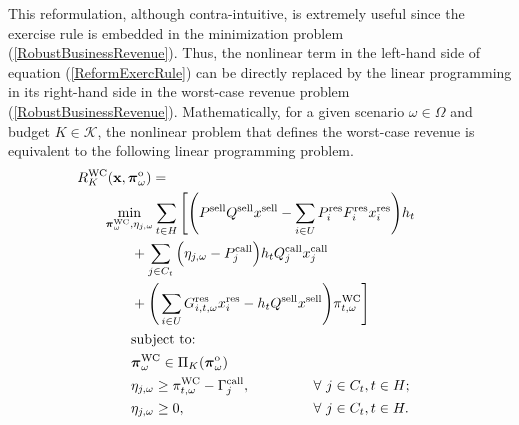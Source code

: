 	This reformulation, although contra-intuitive, is extremely useful since the exercise rule is embedded in the minimization problem (\ref{RobustBusinessRevenue}). Thus, the nonlinear term in the left-hand side of equation (\ref{ReformExercRule}) can be directly replaced by the linear programming in its right-hand side in the worst-case revenue problem (\ref{RobustBusinessRevenue}). Mathematically, for a given scenario $\omega \in \Omega$ and budget $K \in \mathcal{K}$, the nonlinear problem that defines the worst-case revenue is equivalent to the following linear programming problem.
%
\begin{align}
	& \hspace{-0.45cm} R_{K}^{\text{WC}}(\mathbf{x}, \boldsymbol{\pi}_{\omega}^{\text{o}}) = \notag \\ 
	& \hspace{0.2cm} \min_{\boldsymbol{\pi}^{\text{WC}}_{\omega}, \eta_{j,\omega}} \sum_{t \in H} \Bigg[ \Bigg(P^{\text{sell}} Q^{\text{sell}} x^{\text{sell}} - \sum_{i \in U} P_{i}^{\text{res}} F_{i}^{\text{res}} x_{i}^{\text{res}}\Bigg) h_{t} \notag \\
	& \hspace{0.90cm} + \sum_{j \in C_{t}} \Big( \eta_{j,\omega} - P_{j}^{\text{call}} \Big) h_{t} Q_{j}^{\text{call}} x_{j}^{\text{call}} \notag \\
	& \hspace{0.90cm} + \Bigg( \sum_{i \in U} G_{i,t,\omega}^{\text{res}} x_{i}^{\text{res}} - h_{t} Q^{\text{sell}} x^{\text{sell}} \Bigg)\pi^{\text{WC}}_{t,\omega} \Bigg] \label{RobustBusinessRevenue_Linear1} \\
	& \hspace{0.90cm} \text{subject to:} \notag \\
	& \hspace{0.90cm} \boldsymbol{\pi}^{\text{WC}}_{\omega} \in \Pi_{K}(\boldsymbol{\pi}^{\text{o}}_{\omega}) \label{RobustBusinessRevenue_Linear2} \\
	& \hspace{0.90cm} \eta_{j,\omega} \geq \pi^{\text{WC}}_{t,\omega} - \Gamma_{j}^{\text{call}}, && \hspace{-2.90cm} \forall ~ j \in C_{t}, t \in H; \label{RobustBusinessRevenue_Linear3} \\
	& \hspace{0.90cm} \eta_{j,\omega} \geq 0, && \hspace{-2.90cm} \forall ~ j \in C_{t}, t \in H. \label{RobustBusinessRevenue_Linear4}
\end{align}

